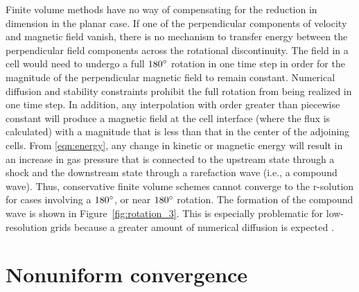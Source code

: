 Finite volume methods have no way of compensating for the reduction in dimension in the planar case.  If one of the perpendicular components of velocity and magnetic field vanish, there is no mechanism to transfer energy between the perpendicular field components across the rotational discontinuity.  The field in a cell would need to undergo a full $180^\circ$ rotation in one time step in order for the magnitude of the perpendicular magnetic field to remain constant.  Numerical diffusion and stability constraints prohibit the full rotation from being realized in one time step.  In addition, any interpolation with order greater than piecewise constant will produce a magnetic field at the cell interface (where the flux is calculated) with a magnitude that is less than that in the center of the adjoining cells.  From \eqref{eqn:energy}, any change in kinetic or magnetic energy will result in an increase in gas pressure that is connected to the upstream state through a shock and the downstream state through a rarefaction wave (i.e., a compound wave).  Thus, conservative finite volume schemes cannot converge to the r-solution for cases involving a $180^\circ$, or near $180^\circ$ rotation.  The formation of the compound wave is shown in Figure~\ref{fig:rotation_3}.  This is especially problematic for low-resolution grids because a greater amount of numerical diffusion is expected \citep{Barmin:1996,Torrilhon:2003b}.  

\section[Nonuniform convergence]{Nonuniform convergence}
\label{sec:nonuniform_converge}

